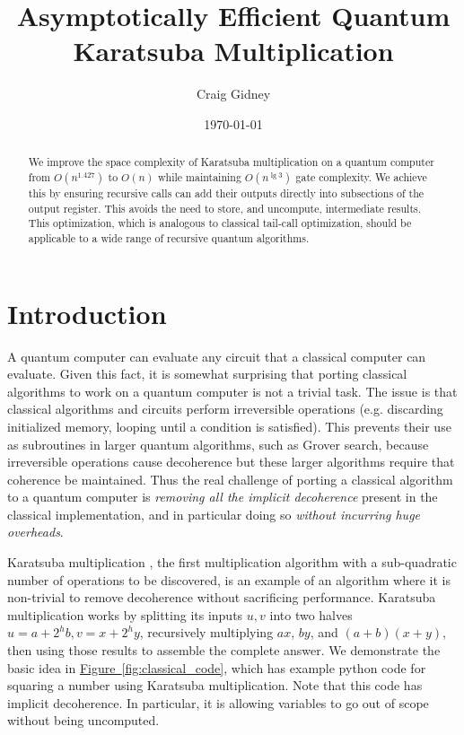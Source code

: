 \documentclass[onecolumn,unpublished]{quantumarticle}
\newcommand{\fig}[1]{\hyperref[fig:#1]{Figure~\ref*{fig:#1}}}
\begin{document}
\title{Asymptotically Efficient Quantum Karatsuba Multiplication}

\date{\today}
\author{Craig Gidney}

\begin{abstract}
We improve the space complexity of Karatsuba multiplication on a quantum computer from $O(n^{1.427})$ to $O(n)$ while maintaining $O(n^{\lg 3})$ gate complexity.
We achieve this by ensuring recursive calls can add their outputs directly into subsections of the output register.
This avoids the need to store, and uncompute, intermediate results.
This optimization, which is analogous to classical tail-call optimization, should be applicable to a wide range of recursive quantum algorithms.
\end{abstract}

\maketitle


\section{Introduction}
\label{sec:introduction}

A quantum computer can evaluate any circuit that a classical computer can evaluate.
Given this fact, it is somewhat surprising that porting classical algorithms to work on a quantum computer is not a trivial task.
The issue is that classical algorithms and circuits perform irreversible operations (e.g. discarding initialized memory, looping until a condition is satisfied).
This prevents their use as subroutines in larger quantum algorithms, such as Grover search, because irreversible operations cause decoherence but these larger algorithms require that coherence be maintained.
Thus the real challenge of porting a classical algorithm to a quantum computer is {\em removing all the implicit decoherence} present in the classical implementation, and in particular doing so {\em without incurring huge overheads}.

Karatsuba multiplication \cite{karatsuba1962multiplication}, the first multiplication algorithm with a sub-quadratic number of operations to be discovered, is an example of an algorithm where it is non-trivial to remove decoherence without sacrificing performance.
Karatsuba multiplication works by splitting its inputs $u, v$ into two halves $u=a+2^{h} b, v=x+2^{h} y$, recursively multiplying $ax$, $by$, and $(a+b)(x+y)$, then using those results to assemble the complete answer.
We demonstrate the basic idea in \fig{classical_code}, which has example python code for squaring a number using Karatsuba multiplication.
Note that this code has implicit decoherence.
In particular, it is allowing variables to go out of scope without being uncomputed.
\end{document}
